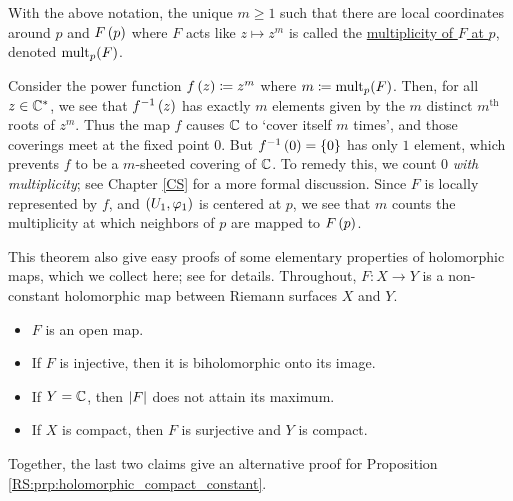 \documentclass[../Moduli_Spaces_of_Riemann_Surfaces.tex]{subfiles}
\begin{document}
    \begin{definition}
        With the above notation, the unique $m\geq1$ such that there are local coordinates around $p$ and $F\left(p\right)$ where $F$ acts like $z\mapsto z^m$ is called the \ul{multiplicity of $F$ at $p$}, denoted $\operatorname{mult}_p\!\left(F\right)$.
    \end{definition}
    \begin{remark}
        Consider the power function $f\left(z\right)\coloneqq z^m$ where $m\coloneqq\operatorname{mult}_p\!\left(F\right)$. Then, for all $z\in\mathbb{C}^*$, we see that $f^{-1}\left(z\right)$ has exactly $m$ elements given by the $m$ distinct $m^\textrm{th}$ roots of $z^m$. Thus the map $f$ causes $\mathbb{C}$ to `cover itself $m$ times', and those coverings meet at the fixed point $0$. But $f^{-1}\left(0\right)=\left\{0\right\}$ has only $1$ element, which prevents $f$ to be a $m$-sheeted covering of $\mathbb{C}$. To remedy this, we count $0$ \textit{with multiplicity}; see Chapter \ref{CS} for a more formal discussion. Since $F$ is locally represented by $f$, and $\left(U_1,\varphi_1\right)$ is centered at $p$, we see that $m$ counts the multiplicity at which neighbors of $p$ are mapped to $F\left(p\right)$.\exqed
    \end{remark}
    \begin{remark}
        This theorem also give easy proofs of some elementary properties of holomorphic maps, which we collect here; see \cite[][Section 1.2]{forster} for details. Throughout, $F:X\to Y$ is a non-constant holomorphic map between Riemann surfaces $X$ and $Y$.
        \begin{itemize}
            \item $F$ is an open map.
                \vspace{-0.05in}
            \item If $F$ is injective, then it is biholomorphic onto its image.
                \vspace{-0.05in}
            \item If $Y=\mathbb{C}$, then $\left|F\right|$ does not attain its maximum.
                \vspace{-0.05in}
            \item If $X$ is compact, then $F$ is surjective and $Y$ is compact.
        \end{itemize}
        Together, the last two claims give an alternative proof for Proposition \ref{RS:prp:holomorphic_compact_constant}.\exqed
    \end{remark}
\end{document}
